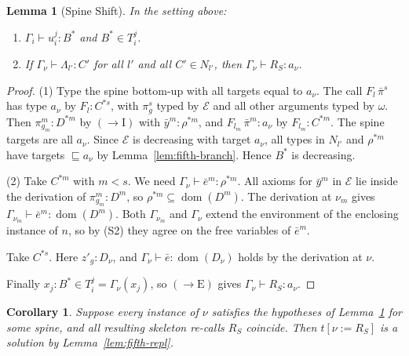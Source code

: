 \documentclass[10pt,a4paper]{article}
\theoremstyle{plain}%
\newtheorem{lemma}[theorem]{Lemma}
\newtheorem{corollary}[theorem]{Corollary}
\DeclareMathOperator{\dom}{dom}
\begin{document}
\begin{lemma}[Spine Shift]\label{lem:fifth-spine}
In the setting above:
\begin{enumerate}
\item $\Gamma_i \vdash u_i^j : B^*$ and $B^* \in T_i^j$.
\item If $\Gamma_\nu \vdash \Lambda_{l'} : C'$ for all $l'$ and all $C' \in N_{l'}$, then $\Gamma_\nu \vdash R_S : a_\nu$.
\end{enumerate}
\end{lemma}

\begin{proof}
(1) Type the spine bottom-up with all targets equal to $a_\nu$.
The call $F_l\,\bar\pi^s$ has type $a_\nu$ by $F_l : C^{*s}$, with $\pi^s_g$ typed by $\mathcal{E}$ and all other arguments typed by $\omega$.
Then $\pi^m_{g_m} : D^{*m}$ by $(\to\mathrm{I})$ with $\bar y^m : \rho^{*m}$, and $F_{l_m}\,\bar\pi^m : a_\nu$ by $F_{l_m} : C^{*m}$.
The spine targets are all $a_\nu$.
Since $\mathcal{E}$ is decreasing with target $a_\nu$, all types in $N_{l'}$ and $\rho^{*m}$ have targets $\sqsubseteq a_\nu$ by Lemma~\ref{lem:fifth-branch}.
Hence $B^*$ is decreasing.

(2) Take $C^{*m}$ with $m < s$.
We need $\Gamma_\nu \vdash \bar e^m : \rho^{*m}$.
All axioms for $\bar y^m$ in $\mathcal{E}$ lie inside the derivation of $\pi^m_{g_m} : D^m$, so $\rho^{*m} \subseteq \dom(D^m)$.
The derivation at $\nu_m$ gives $\Gamma_{\nu_m} \vdash \bar e^m : \dom(D^m)$.
Both $\Gamma_{\nu_m}$ and $\Gamma_\nu$ extend the environment of the enclosing instance of $n$, so by (S2) they agree on the free variables of $\bar e^m$.

Take $C^{*s}$.
Here $z'_g : D_\nu$, and $\Gamma_\nu \vdash \bar e : \dom(D_\nu)$ holds by the derivation at $\nu$.

Finally $x_j : B^* \in T_i^j = \Gamma_\nu(x_j)$, so $(\to\mathrm{E})$ gives $\Gamma_\nu \vdash R_S : a_\nu$.
\end{proof}

\begin{corollary}\label{cor:fifth-spine}
Suppose every instance of $\nu$ satisfies the hypotheses of Lemma~\ref{lem:fifth-spine} for some spine, and all resulting skeleton re-calls $R_S$ coincide.
Then $t[\nu := R_S]$ is a solution by Lemma~\ref{lem:fifth-repl}.
\end{corollary}
\end{document}
